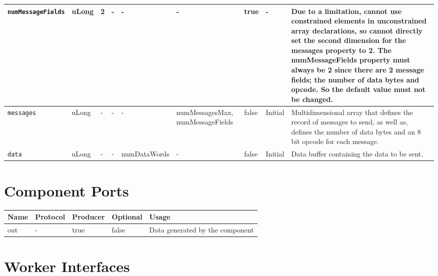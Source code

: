 \begin{landscape}
\begin{flushleft}
\begin{scriptsize}
\begin{tabular}{|p{2.5cm}|p{1cm}|p{1.5cm}|p{2cm}|p{2cm}|p{2.5cm}|p{1.5cm}|p{1.5cm}|p{5.5cm}|}
                \hline
                \verb+numMessageFields+ & uLong & 2 & - & - & - & true & - & Due to a limitation, cannot use constrained elements in unconstrained array declarations, so cannot directly set the second dimension for the messages property to 2. The numMessageFields property must always be 2 since there are 2 message fields; the number of data bytes and opcode. So the default value must not be changed.  \\
                \hline
                \verb+messages+ & uLong & - & - & - & numMessagesMax, numMessageFields & false & Initial & Multidimensional array that defines the record of messages to send, as well as, defines the number of data bytes and an 8 bit opcode for each message.\\
                \hline
                \verb+data+ & uLong & - & - & numDataWords & - & false & Initial & Data buffer containing the data to be sent.\\
                \hline
        \end{tabular}
        \end{scriptsize}


\end{flushleft}


\section*{Component Ports}

        \begin{scriptsize}
                \begin{tabular}{|M{2.5cm}|M{2cm}|M{2cm}|M{2.5cm}|M{12.5cm}|}
                        \hline
                        Name & Protocol & Producer & Optional & Usage\\
                        \hline
                        out
                        & -
                        & true
                        & false
                        & Data generated by the component \\
                        \hline
                \end{tabular}
			\end{scriptsize}

\section*{Worker Interfaces}

\end{landscape}
